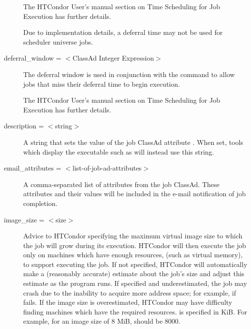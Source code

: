 \begin{description}
The HTCondor User's manual section on Time Scheduling for Job Execution
has further details.

Due to implementation details,
a deferral time may not be used for scheduler universe jobs.


\label{condor-submit-deferral-window}
\item[deferral\_window = $<$ClassAd Integer Expression$>$]
The deferral window is used in conjunction with the
 command to allow jobs that
miss their deferral time to begin execution.

The HTCondor User's manual section on Time Scheduling for Job Execution
has further details.


\label{condor-submit-description}
\item[description = $<$string$>$]
A string that sets the value of the job ClassAd attribute
.
When set, tools which display the executable such as 
will instead use this string.


\label{condor-submit-email-attributes}
\item[email\_attributes = $<$list-of-job-ad-attributes$>$] 
A comma-separated list of attributes from the job ClassAd. These
attributes and their values will be included in the e-mail notification
of job completion.


\label{condor-submit-image-size}
\item[image\_size = $<$size$>$] Advice to HTCondor specifying the maximum
virtual image size to which the job will grow during its execution.
HTCondor will then execute the job only on machines which have enough resources,
(such as virtual memory), to support executing the job.
If not specified, HTCondor will automatically make a (reasonably accurate)
estimate about the job's size and adjust this estimate as the program runs.
If specified and underestimated, the job may crash due to
the inability to acquire more address space; 
for example, if  fails. 
If the image size is overestimated,
HTCondor may have difficulty finding machines which have the required resources.
 is specified in KiB. 
For example, for an image size of 8 MiB,  should be 8000.


\end{description}
